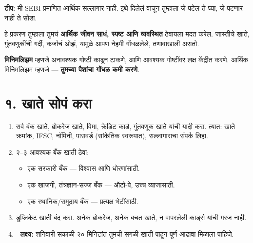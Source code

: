 \textbf{टीप:} मी SEBI-प्रमाणित आर्थिक सल्लागार नाही.  
इथे दिलेलं वाचून तुम्हाला जे पटेल ते घ्या,  
जे पटणार नाही ते सोडा.  

हे प्रकरण तुम्हाला तुमचं \textbf{आर्थिक जीवन साधं, स्पष्ट आणि व्यवस्थित} ठेवायला मदत करेल.  
जास्तीचे खाते, गुंतवणुकींची गर्दी, कर्जाचं ओझं,  
यामुळे आपण नेहमी गोंधळलेले, तणावाखाली असतो.  

\textbf{मिनिमलिझम} म्हणजे अनावश्यक गोष्टी काढून टाकणे,  
आणि आवश्यक गोष्टींवर लक्ष केंद्रीत करणे.  
आर्थिक मिनिमलिझम म्हणजे — \textbf{तुमच्या पैशांचा गोंधळ कमी करणे}.  


\section*{१. खाते सोपं करा}
\begin{enumerate}
\item सर्व बँक खाते, ब्रोकरेज खाते, विमा, क्रेडिट कार्ड,  
गुंतवणूक खाते यांची यादी करा.  
त्यात: खाते क्रमांक, IFSC, नॉमिनी, पासवर्ड (सांकेतिक स्वरूपात),  
सल्लागाराचा संपर्क लिहा.  

\item २–३ आवश्यक बँक खाती ठेवा:  
\begin{itemize}
\item एक सरकारी बँक — विश्वास आणि धोरणांसाठी.  
\item एक खाजगी, तंत्रज्ञान-सज्ज बँक — ऑटो-पे, उच्च व्याजासाठी.  
\item एक स्थानिक/समुदाय बँक — प्रत्यक्ष भेटींसाठी.  
\end{itemize}

\item डुप्लिकेट खाती बंद करा.  
अनेक ब्रोकरेज, अनेक बचत खाते, न वापरलेली कार्ड्स यांची गरज नाही.  

\item 🎯 \textbf{लक्ष्य:} शनिवारी सकाळी २० मिनिटांत तुमची सगळी खाती पाहून पूर्ण आढावा मिळाला पाहिजे.  
\end{enumerate}

